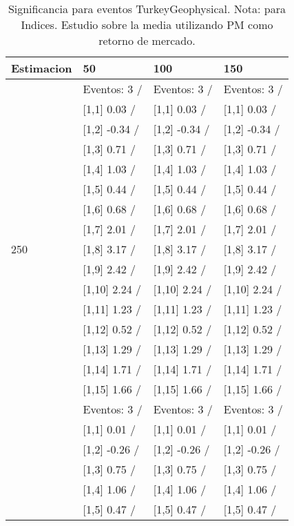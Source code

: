 \begin{table}

\caption{Significancia para eventos TurkeyGeophysical. Nota: para Indices. Estudio sobre la media utilizando PM como retorno de mercado.}
\centering
\begin{tabular}[t]{llll}
\toprule
Estimacion & 50 & 100 & 150\\
\midrule
 & Eventos:  3 / & Eventos:  3 / & Eventos:  3 /\\
 & {}[1,1] 0.03  / & {}[1,1] 0.03  / & {}[1,1] 0.03  /\\
 & {}[1,2] -0.34  / & {}[1,2] -0.34  / & {}[1,2] -0.34  /\\
 & {}[1,3] 0.71  / & {}[1,3] 0.71  / & {}[1,3] 0.71  /\\
 & {}[1,4] 1.03  / & {}[1,4] 1.03  / & {}[1,4] 1.03  /\\
\addlinespace
 & {}[1,5] 0.44  / & {}[1,5] 0.44  / & {}[1,5] 0.44  /\\
 & {}[1,6] 0.68  / & {}[1,6] 0.68  / & {}[1,6] 0.68  /\\
 & {}[1,7] 2.01  / & {}[1,7] 2.01  / & {}[1,7] 2.01  /\\
250 & {}[1,8] 3.17  / & {}[1,8] 3.17  / & {}[1,8] 3.17  /\\
 & {}[1,9] 2.42  / & {}[1,9] 2.42  / & {}[1,9] 2.42  /\\
\addlinespace
 & {}[1,10] 2.24  / & {}[1,10] 2.24  / & {}[1,10] 2.24  /\\
 & {}[1,11] 1.23  / & {}[1,11] 1.23  / & {}[1,11] 1.23  /\\
 & {}[1,12] 0.52  / & {}[1,12] 0.52  / & {}[1,12] 0.52  /\\
 & {}[1,13] 1.29  / & {}[1,13] 1.29  / & {}[1,13] 1.29  /\\
 & {}[1,14] 1.71  / & {}[1,14] 1.71  / & {}[1,14] 1.71  /\\
\addlinespace
 & {}[1,15] 1.66  / & {}[1,15] 1.66  / & {}[1,15] 1.66  /\\
 & Eventos:  3 / & Eventos:  3 / & Eventos:  3 /\\
 & {}[1,1] 0.01  / & {}[1,1] 0.01  / & {}[1,1] 0.01  /\\
 & {}[1,2] -0.26  / & {}[1,2] -0.26  / & {}[1,2] -0.26  /\\
 & {}[1,3] 0.75  / & {}[1,3] 0.75  / & {}[1,3] 0.75  /\\
\addlinespace
 & {}[1,4] 1.06  / & {}[1,4] 1.06  / & {}[1,4] 1.06  /\\
 & {}[1,5] 0.47  / & {}[1,5] 0.47  / & {}[1,5] 0.47  /\\

\end{tabular}
\end{table}
